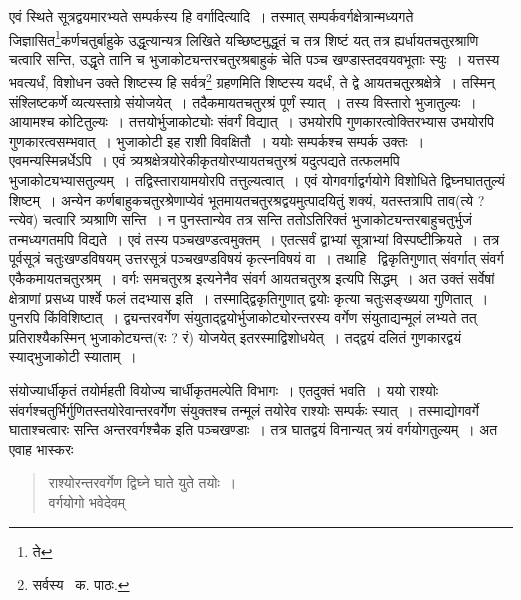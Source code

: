 \documentclass[11pt, openany]{book}
\begin{document}
एवं स्थिते सूत्रद्वयमारभ्यते सम्पर्कस्य हि वर्गादित्यादि~। तस्मात् सम्पर्कवर्गक्षेत्रान्मध्यगते जिज्ञासित\renewcommand{\thefootnote}{१}\footnote{ते}कर्णचतुर्बाहुके उद्धृत्यान्यत्र
लिखिते यच्छिष्टमुद्धृतं च तत्र शिष्टं यत् तत्र ह्यर्धायतचतुरश्राणि चत्वारि सन्ति, उद्धृते तानि च भुजाकोट्यन्तरचतुरश्रबाहुकं चेति पञ्च खण्डास्तदवयवभूताः स्युः~। यत्तस्य भवत्यर्धं, विशोधन उक्ते शिष्टस्य हि सर्वत्र\renewcommand{\thefootnote}{२}\footnote{सर्वस्य \textendash\ क. पाठः.} ग्रहणमिति शिष्टस्य यदर्धं, ते द्वे आयतचतुरश्रक्षेत्रे~। तस्मिन् संश्लिष्टकर्णे व्यत्यस्ताग्रे संयोजयेत्~। तदैकमायतचतुरश्रं पूर्णं स्यात्~। तस्य विस्तारो भुजातुल्यः~। आयामश्च कोटितुल्यः~। तत्तयोर्भुजाकोट्योः संवर्गं विद्यात्~। उभयोरपि गुणकारत्वोक्तिरभ्यास उभयोरपि गुणकारत्वसम्भवात्~। भुजाकोटी इह राशी विवक्षितौ~। ययोः सम्पर्कश्च सम्पर्क उक्तः~। एवमन्यस्मिन्नर्धेऽपि~। एवं त्र्यश्रक्षेत्रयोरेकीकृतयोरप्यायतचतुरश्रं यदुत्पद्यते तत्फलमपि भुजाकोट्यभ्यासतुल्यम्~। तद्विस्तारायामयोरपि तत्तुल्यत्वात्~। एवं योगवर्गाद्वर्गयोगे विशोधिते द्विघ्नघाततुल्यं शिष्टम्~। अन्येन कर्णबाहुकचतुरश्रेणाप्येवं भूतमायतचतुरश्रद्वयमुत्पादयितुं शक्यं, यतस्तत्रापि ताव(त्ये ? न्त्येव) चत्वारि त्र्यश्राणि सन्ति~। न पुनस्तान्येव तत्र सन्ति ततोऽतिरिक्तं भुजाकोट्यन्तरबाहुचतुर्भुजं तन्मध्यगतमपि विद्यते~। एवं तस्य पञ्चखण्डत्वमुक्तम्~। एतत्सर्वं द्वाभ्यां सूत्राभ्यां विस्पष्टीक्रियते~। तत्र पूर्वसूत्रं चतुःखण्डविषयम् उत्तरसूत्रं पञ्चखण्डविषयं कृत्स्नविषयं वा~। तथाहि \textendash\ द्विकृतिगुणात् संवर्गात् संवर्ग एकैकमायतचतुरश्रम्~। वर्गः समचतुरश्र इत्यनेनैव संवर्ग आयतचतुरश्र इत्यपि सिद्धम्~। अत उक्तं {\qt सर्वेषां क्षेत्राणां प्रसध्य पार्श्वे फलं तदभ्यास} इति~। तस्माद्द्विकृतिगुणात् द्वयोः कृत्या चतुःसङ्ख्यया गुणितात्~। पुनरपि किंविशिष्टात्~। द्व्यन्तरवर्गेण संयुताद्द्वयोर्भुजाकोट्योरन्तरस्य वर्गेण संयुताद्यन्मूलं लभ्यते तत् प्रतिराश्यैकस्मिन् भुजाकोट्यन्त(रः ? रं) योजयेत्
इतरस्माद्विशोधयेत्~। तद्द्वयं दलितं गुणकारद्वयं स्याद्भुजाकोटी स्याताम्~।

\newpage

\noindent संयोज्यार्धीकृतं तयोर्महती वियोज्य चार्धीकृतमल्पेति विभागः~। एतदुक्तं भवति~। ययो राश्योः संवर्गश्चतुर्भिर्गुणितस्तयोरेवान्तरवर्गेण
संयुक्तश्च तन्मूलं तयोरेव राश्योः सम्पर्कः स्यात्~। तस्माद्योगवर्गे घाताश्चत्वारः सन्ति अन्तरवर्गश्चैक इति पञ्चखण्डाः~। तत्र घातद्वयं विनान्यत् त्रयं
वर्गयोगतुल्यम्~। अत एवाह भास्करः\textendash

\begin{quote}
{\qt राश्योरन्तरवर्गेण द्विघ्ने घाते युते तयोः~।\\
वर्गयोगो भवेदेवम्}
\end{quote}
\end{document}
